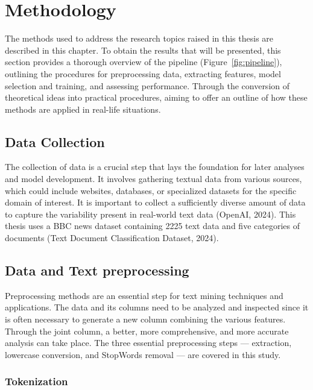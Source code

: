 \chapter{Methodology}

The methods used to address the research topics raised in this thesis are described in this chapter. To obtain the results that will be presented, this section provides a thorough overview of the pipeline (Figure~\ref{fig:pipeline}), outlining the procedures for preprocessing data, extracting features, model selection and training, and assessing performance. Through the conversion of theoretical ideas into practical procedures, aiming to offer an outline of how these methods are applied in real-life situations.


\section{Data Collection}

The collection of data is a crucial step that lays the foundation for later analyses and model development. It involves gathering textual data from various sources, which could include websites, databases, or specialized datasets for the specific domain of interest. It is important to collect a sufficiently diverse amount of data to capture the variability present in real-world text data (OpenAI, 2024). This thesis uses a BBC news dataset containing 2225 text data and five categories of documents (Text Document Classification Dataset, 2024). 

\section{Data and Text preprocessing}

Preprocessing methods are an essential step for text mining techniques and applications. The data and its columns need to be analyzed and inspected since it is often necessary to generate a new column combining the various features. Through the joint column, a better, more comprehensive, and more accurate analysis can take place. The three essential preprocessing steps — extraction, lowercase conversion, and StopWords removal — are covered in this study.

\subsection{Tokenization}

